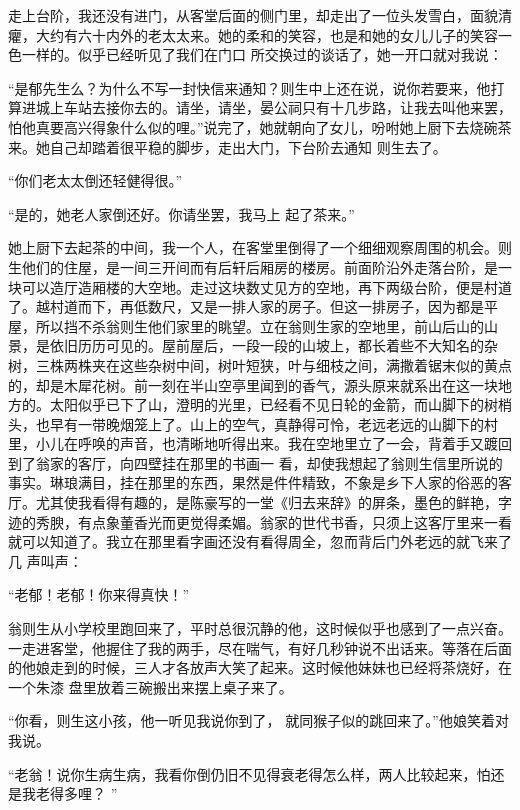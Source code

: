 \documentclass{article}
\begin{document}
走上台阶，我还没有进门，从客堂后面的侧门里，却走出了一位头发雪白，面貌清癯，大约有六十内外的老太太来。她的柔和的笑容，也是和她的女儿儿子的笑容一色一样的。似乎已经听见了我们在门口
所交换过的谈话了，她一开口就对我说： 

“是郁先生么？为什么不写一封快信来通知？则生中上还在说，说你若要来，他打算进城上车站去接你去的。请坐，请坐，晏公祠只有十几步路，让我去叫他来罢，怕他真要高兴得象什么似的哩。”说完了，她就朝向了女儿，吩咐她上厨下去烧碗茶来。她自己却踏着很平稳的脚步，走出大门，下台阶去通知
则生去了。 


“你们老太太倒还轻健得很。” 

\newpage

“是的，她老人家倒还好。你请坐罢，我马上
起了茶来。” 

她上厨下去起茶的中间，我一个人，在客堂里倒得了一个细细观察周围的机会。则生他们的住屋，是一间三开间而有后轩后厢房的楼房。前面阶沿外走落台阶，是一块可以造厅造厢楼的大空地。走过这块数丈见方的空地，再下两级台阶，便是村道了。越村道而下，再低数尺，又是一排人家的房子。但这一排房子，因为都是平屋，所以挡不杀翁则生他们家里的眺望。立在翁则生家的空地里，前山后山的山景，是依旧历历可见的。屋前屋后，一段一段的山坡上，都长着些不大知名的杂树，三株两株夹在这些杂树中间，树叶短狭，叶与细枝之间，满撒着锯末似的黄点的，却是木犀花树。前一刻在半山空亭里闻到的香气，源头原来就系出在这一块地方的。太阳似乎已下了山，澄明的光里，已经看不见日轮的金箭，而山脚下的树梢头，也早有一带晚烟笼上了。山上的空气，真静得可怜，老远老远的山脚下的村里，小儿在呼唤的声音，也清晰地听得出来。我在空地里立了一会，背着手又踱回到了翁家的客厅，向四壁挂在那里的书画一
\newpage
看，却使我想起了翁则生信里所说的事实。琳琅满目，挂在那里的东西，果然是件件精致，不象是乡下人家的俗恶的客厅。尤其使我看得有趣的，是陈豪写的一堂《归去来辞》的屏条，墨色的鲜艳，字迹的秀腴，有点象董香光而更觉得柔媚。翁家的世代书香，只须上这客厅里来一看就可以知道了。我立在那里看字画还没有看得周全，忽而背后门外老远的就飞来了几
声叫声： 


“老郁！老郁！你来得真快！” 

翁则生从小学校里跑回来了，平时总很沉静的他，这时候似乎也感到了一点兴奋。一走进客堂，他握住了我的两手，尽在喘气，有好几秒钟说不出话来。等落在后面的他娘走到的时候，三人才各放声大笑了起来。这时候他妹妹也已经将茶烧好，在一个朱漆
盘里放着三碗搬出来摆上桌子来了。 

“你看，则生这小孩，他一听见我说你到了，
就同猴子似的跳回来了。”他娘笑着对我说。 

\newpage

“老翁！说你生病生病，我看你倒仍旧不见得衰老得怎么样，两人比较起来，怕还是我老得多哩？
” 
\end{document}
